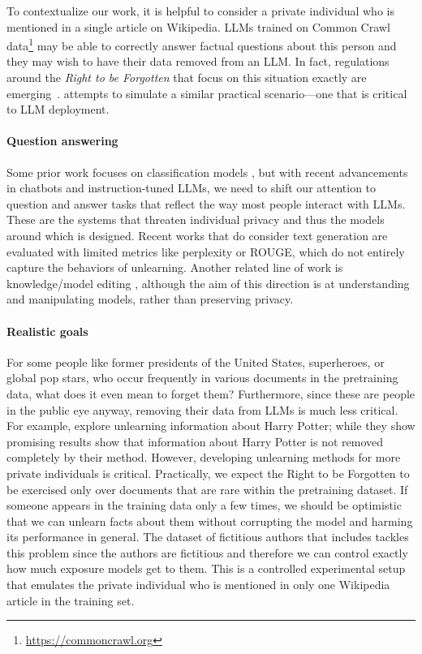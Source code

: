 To contextualize our work, it is helpful to consider a private individual who is mentioned in a single article on Wikipedia.
LLMs trained on Common Crawl data\footnote{\href{https://commoncrawl.org}{https://commoncrawl.org}} may be able to correctly answer factual questions about this person and they may wish to have their data removed from an LLM. 
In fact, regulations around the \emph{Right to be Forgotten} that focus on this situation exactly are emerging~\citep{regulation2016regulation, ccpa2021, voigt2017eu, zhang2023right}.
\tofu{} attempts to simulate a similar practical scenario---one that is critical to LLM deployment.


\paragraph{Question answering} 
Some prior work focuses on classification models \citep[e.g][]{guo2019certified,golatkar2020eternal,kurmanji2023the,wang2023kga,chen2023unlearn,pawelczyk2023context}, but with recent advancements in chatbots and instruction-tuned LLMs, we need to shift our attention to question and answer tasks that reflect the way most people interact with LLMs.
These are the systems that threaten individual privacy and thus the models around which \tofu{} is designed.
Recent works that do consider text generation \citep{chen2023unlearn,jang2022knowledge,kim2023propile} are evaluated with limited metrics like perplexity or ROUGE, which do not entirely capture the behaviors of unlearning. Another related line of work is knowledge/model editing \citep{de2021editing, meng2022locating, zhang2024comprehensive}, although the aim of this direction is at understanding and manipulating models, rather than preserving privacy.

\paragraph{Realistic goals} 
For some people like former presidents of the United States, superheroes, or global pop stars, who occur frequently in various documents in the pretraining data, what does it even mean to forget them?
Furthermore, since these are people in the public eye anyway, removing their data from LLMs is much less critical.
For example, \citet{eldan2023s} explore unlearning information about Harry Potter; while they show promising results \citet{shi2023detecting} show that information about Harry Potter is not removed completely by their method.
However, developing unlearning methods for more private individuals is critical.
Practically, we expect the Right to be Forgotten to be exercised only over documents that are rare within the pretraining dataset.
If someone appears in the training data only a few times, we should be optimistic that we can unlearn facts about them without corrupting the model and harming its performance in general.
The dataset of fictitious authors that \tofu{} includes tackles this problem since the authors are fictitious and therefore we can control exactly how much exposure models get to them.
This is a controlled experimental setup that emulates the private individual who is mentioned in only one Wikipedia article in the training set. 


